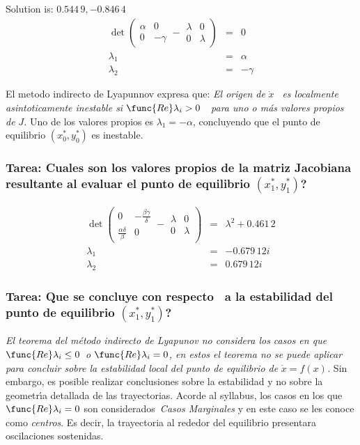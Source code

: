 \documentclass[letterpaper,11pt]{article}
\begin{document}
Solution is: $0.544\,9,-0.846\,4\allowbreak $%
\begin{eqnarray*}
\det (%
\begin{array}{cc}
\alpha & 0 \\ 
0 & -\gamma%
\end{array}%
-%
\begin{array}{cc}
\lambda & 0 \\ 
0 & \lambda%
\end{array}%
) &=&0 \\
\allowbreak \lambda _{1} &=&\alpha \\
\lambda _{2} &=&-\gamma
\end{eqnarray*}

El metodo indirecto de Lyapunnov expresa que: \textit{El origen de }$\dot{x}$%
\textit{\ es localmente asintoticamente inestable si }$\func{Re}\lambda
_{i}>0$\textit{\ \ para uno o m\'{a}s valores propios de }$J$\textit{.} Uno
de los valores propios es $\lambda _{1}=-\alpha $, concluyendo que el punto
de equilibrio $(x_{0}^{\ast },y_{0}^{\ast })$ es inestable.

\subsubsection{\textbf{Tarea}: Cuales son los valores propios de la matriz
Jacobiana resultante al evaluar el punto de equilibrio $(x_{1}^{\ast
},y_{1}^{\ast })$?}

\begin{eqnarray*}
\det (%
\begin{array}{cc}
0 & -\frac{\beta \gamma }{\delta } \\ 
\frac{\alpha \delta }{\beta } & 0%
\end{array}%
-%
\begin{array}{cc}
\lambda & 0 \\ 
0 & \lambda%
\end{array}%
) &=&\allowbreak \lambda ^{2}+0.461\,2 \\
\lambda _{1} &=&-0.679\,12i \\
\lambda _{2} &=&0.679\,12i
\end{eqnarray*}

\subsubsection{Tarea: Que se concluye con respecto \ a la estabilidad del
punto de equilibrio $(x_{1}^{\ast },y_{1}^{\ast })$?}

\textit{El teorema del m\'{e}todo indirecto de Lyapunov no considera los
casos en que }$\func{Re}\lambda _{i}\leq 0$\textit{\ o }$\func{Re}\lambda
_{i}=0$\textit{, en estos el teorema no se puede aplicar para concluir sobre
la estabilidad local del punto de equilibrio de }$\dot{x}=f(x)$\textit{.}
Sin embargo, es posible realizar conclusiones sobre la estabilidad y no
sobre la geometr\'{\i}a detallada de las trayectorias. Acorde al syllabus,
los casos en los que $\func{Re}\lambda _{i}=0$ son considerados\textit{\
Casos Marginales }y en este caso se les conoce como \textit{centros}. Es
decir, la trayectoria al rededor del equilibrio presentara oscilaciones
sostenidas.
\end{document}
